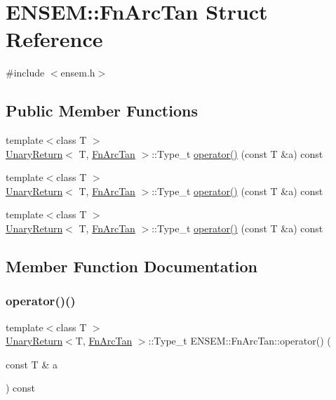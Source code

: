 \hypertarget{structENSEM_1_1FnArcTan}{}\section{E\+N\+S\+EM\+:\+:Fn\+Arc\+Tan Struct Reference}
\label{structENSEM_1_1FnArcTan}


{\ttfamily \#include $<$ensem.\+h$>$}

\subsection*{Public Member Functions}
\begin{DoxyCompactItemize}
\item 
{\footnotesize template$<$class T $>$ }\\\mbox{\hyperlink{structENSEM_1_1UnaryReturn}{Unary\+Return}}$<$ T, \mbox{\hyperlink{structENSEM_1_1FnArcTan}{Fn\+Arc\+Tan}} $>$\+::Type\+\_\+t \mbox{\hyperlink{structENSEM_1_1FnArcTan_afb87d30d5f337130faf32e6af2c2669f}{operator()}} (const T \&a) const
\item 
{\footnotesize template$<$class T $>$ }\\\mbox{\hyperlink{structENSEM_1_1UnaryReturn}{Unary\+Return}}$<$ T, \mbox{\hyperlink{structENSEM_1_1FnArcTan}{Fn\+Arc\+Tan}} $>$\+::Type\+\_\+t \mbox{\hyperlink{structENSEM_1_1FnArcTan_afb87d30d5f337130faf32e6af2c2669f}{operator()}} (const T \&a) const
\item 
{\footnotesize template$<$class T $>$ }\\\mbox{\hyperlink{structENSEM_1_1UnaryReturn}{Unary\+Return}}$<$ T, \mbox{\hyperlink{structENSEM_1_1FnArcTan}{Fn\+Arc\+Tan}} $>$\+::Type\+\_\+t \mbox{\hyperlink{structENSEM_1_1FnArcTan_afb87d30d5f337130faf32e6af2c2669f}{operator()}} (const T \&a) const
\end{DoxyCompactItemize}


\subsection{Member Function Documentation}
\mbox{\label{structENSEM_1_1FnArcTan_afb87d30d5f337130faf32e6af2c2669f}} 
\subsubsection{\texorpdfstring{operator()()}{operator()()}\hspace{0.1cm}{\footnotesize\ttfamily [1/3]}}
{\footnotesize\ttfamily template$<$class T $>$ \\
\mbox{\hyperlink{structENSEM_1_1UnaryReturn}{Unary\+Return}}$<$T, \mbox{\hyperlink{structENSEM_1_1FnArcTan}{Fn\+Arc\+Tan}} $>$\+::Type\+\_\+t E\+N\+S\+E\+M\+::\+Fn\+Arc\+Tan\+::operator() (\begin{DoxyParamCaption}\item[{const T \&}]{a }\end{DoxyParamCaption}) const\hspace{0.3cm}{\ttfamily [inline]}}

